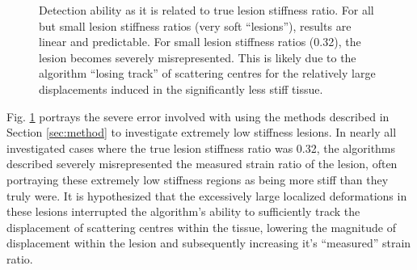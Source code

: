 			\begin{figure}[!t]
				\centering
				\caption[Detection ability as it is related to true lesion stiffness ratio]{Detection ability as it is related to true lesion stiffness ratio. For all but small lesion stiffness ratios (very soft ``lesions''), results are linear and predictable. For small lesion stiffness ratios (0.32), the lesion becomes severely misrepresented. This is likely due to the algorithm ``losing track'' of scattering centres for the relatively large displacements induced in the significantly less stiff tissue.}
				\label{fig:error_stiffness_ratio}
			\end{figure}

			Fig. \ref{fig:error_stiffness_ratio} portrays the severe error involved with using the methods described in Section \ref{sec:method} to investigate extremely low stiffness lesions. In nearly all investigated cases where the true lesion stiffness ratio was 0.32, the algorithms described severely misrepresented the measured strain ratio of the lesion, often portraying these extremely low stiffness regions as being more stiff than they truly were. It is hypothesized that the excessively large localized deformations in these lesions interrupted the algorithm's ability to sufficiently track the displacement of scattering centres within the tissue, lowering the magnitude of displacement within the lesion and subsequently increasing it's ``measured'' strain ratio.

